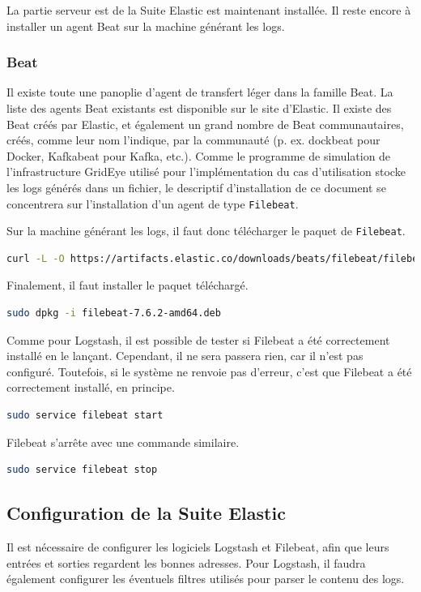 \documentclass[paper=a4, fontsize=11pt]{scrartcl}
\begin{document}
La partie \og serveur \fg est de la Suite Elastic est maintenant installée. Il reste encore à installer un agent Beat sur la machine générant les logs.

\subsubsection{Beat}
Il existe toute une panoplie d'agent de transfert léger dans la famille Beat. La liste des agents Beat existants est disponible sur le site d'Elastic. Il existe des Beat créés par Elastic, et également un grand nombre de Beat communautaires, créés, comme leur nom l'indique, par la communauté (p. ex. dockbeat pour Docker, Kafkabeat pour Kafka, etc.).
Comme le programme de simulation de l'infrastructure GridEye utilisé pour l'implémentation du cas d'utilisation stocke les logs générés dans un fichier, le descriptif d'installation de ce document se concentrera sur l'installation d'un agent de type \verb,Filebeat,.

Sur la machine générant les logs, il faut donc télécharger le paquet de \verb,Filebeat,.
\begin{lstlisting}[language=bash]
curl -L -O https://artifacts.elastic.co/downloads/beats/filebeat/filebeat-7.6.2-amd64.deb
\end{lstlisting}
Finalement, il faut installer le paquet téléchargé.
\begin{lstlisting}[language=bash]
sudo dpkg -i filebeat-7.6.2-amd64.deb
\end{lstlisting}

Comme pour Logstash, il est possible de tester si Filebeat a été correctement installé en le lançant. Cependant, il ne sera passera rien, car il n'est pas configuré. Toutefois, si le système ne renvoie pas d'erreur, c'est que Filebeat a été correctement installé, en principe.
\begin{lstlisting}[language=bash]
sudo service filebeat start
\end{lstlisting}
Filebeat s'arrête avec une commande similaire.
\begin{lstlisting}[language=bash]
sudo service filebeat stop
\end{lstlisting}

\subsection{Configuration de la Suite Elastic}
Il est nécessaire de configurer les logiciels Logstash et Filebeat, afin que leurs entrées et sorties regardent les bonnes adresses. Pour Logstash, il faudra également configurer les éventuels filtres utilisés pour parser le contenu des logs.
\end{document}
